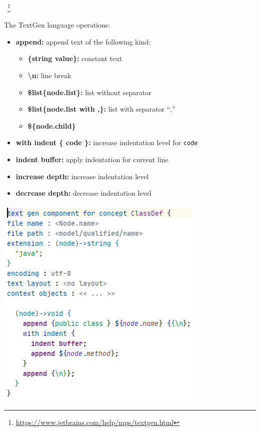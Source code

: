 	\begin{frame}{\workshoptextgen\ \footnote{\url{https://www.jetbrains.com/help/mps/textgen.html}}}
	\begin{minipage}{0.52\textwidth}
		The TextGen language operations:\\
		\begin{itemize}
			\item \textbf{append:} append text of the following kind:
			\begin{itemize}
				\item \textbf{\{string value\}:} constant text
				\item \textbf{\textbackslash n:} line break
				\item \textbf{\$list\{node.list\}:} list without separator
				\item \textbf{\$list\{node.list with ,\}:} list with separator ``,''
				\item \textbf{\$\{node.child\}}
			\end{itemize}
			\item \textbf{with indent \{ code \}:} increase indentation level for \texttt{code}
			\item \textbf{indent buffer:} apply indentation for current line
			\item \textbf{increase depth:} increase indentation level
			\item \textbf{decrease depth:} decrease indentation level
		\end{itemize}
	\end{minipage}
	\begin{minipage}{0.4\textwidth}
		\includegraphics[height=0.9\textheight]{illustrations/textgen.png}
	\end{minipage}
	\end{frame}
	

	


